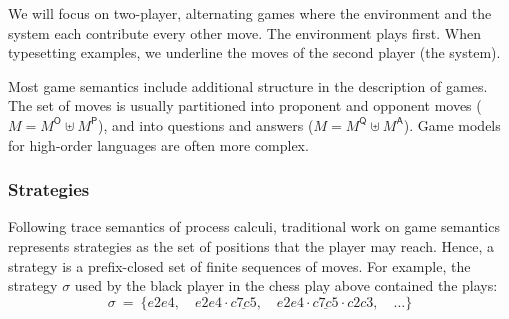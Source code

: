 \documentclass[sigplan,10pt,review,anonymous]{acmart}
\newcommand{\kw}[1]{\ensuremath{ \mathsf{#1} }}
\begin{document}
We will focus on two-player, alternating games
where the environment and the system each contribute every other move.
The environment plays first.
When typesetting examples,
we underline the moves of the second player
(the system).

Most game semantics
include additional structure
in the description of games.
The set of moves is usually partitioned
into proponent and opponent moves ($M = M^\kw{O} \uplus M^\kw{P}$),
and into questions and answers ($M = M^\kw{Q} \uplus M^\kw{A}$).
Game models for high-order languages are often more complex.


\subsubsection{Strategies} \label{sec:mainideas:gs:strat} %

Following trace semantics of process calculi,
traditional work on game semantics
represents strategies as
the set of positions that the player may reach.
Hence,
a strategy is a prefix-closed set of finite sequences of moves.
For example,
the strategy $\sigma$ used by
the black player in the chess play above
contained the plays:
\[
  \sigma \: = \: \{
    e2e4, \quad
    e2e4 \cdot \underline{c7c5}, \quad
    e2e4 \cdot \underline{c7c5} \cdot c2c3, \quad
    \ldots
  \}
\]
\end{document}
